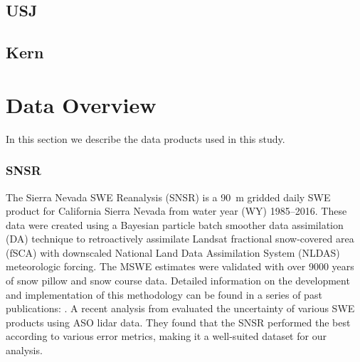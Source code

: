 \hypertarget{ch2-sa-2}{\subsection{USJ}\label{ch2-sa-2}}


\hypertarget{ch2-sa-3}{\subsection{Kern}\label{ch2-sa-3}}


\hypertarget{ch2-do-1}{\section{Data Overview}\label{ch2-do-1}}

In this section we describe the data products used in this study.

\hypertarget{ch2-do-2}{\subsubsection{SNSR}\label{ch2-do-2}}


The Sierra Nevada SWE Reanalysis (SNSR) \citep{margulisLandsatEraSierraNevada2016} is a 90~m gridded daily SWE product for California Sierra Nevada from water year (WY) 1985--2016. These data were created using a Bayesian particle batch smoother data assimilation (DA) technique to retroactively assimilate Landsat fractional snow-covered area (fSCA) with downscaled National Land Data Assimilation System (NLDAS) meteorologic forcing. The MSWE estimates were validated with over 9000 years of snow pillow and snow course data. Detailed information on the development and implementation of this methodology can be found in a series of past publications: \cite{durandBayesianApproachSnow2008, girottoExaminingSpatialTemporal2014, girottoProbabilisticSWEReanalysis2014, margulisParticleBatchSmoother2015}. A recent analysis from \citep{yangIntercomparisonSnowWater2023} evaluated the uncertainty of various SWE products using ASO lidar data. They found that the SNSR performed the best according to various error metrics, making it a well-suited dataset for our analysis.


